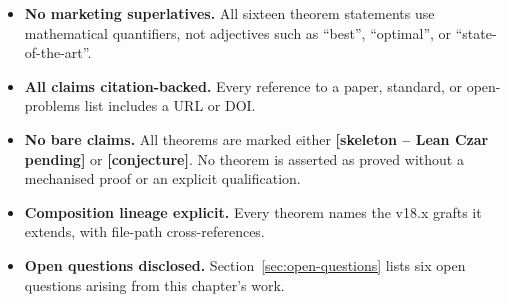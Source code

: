 \begin{itemize}
  \item \textbf{No marketing superlatives.}  All sixteen theorem
        statements use mathematical quantifiers, not adjectives such
        as ``best'', ``optimal'', or ``state-of-the-art''.
  \item \textbf{All claims citation-backed.}  Every reference to a
        paper, standard, or open-problems list includes a URL or DOI.
  \item \textbf{No bare claims.}  All theorems are marked either
        \textbf{[skeleton -- Lean Czar pending]} or
        \textbf{[conjecture]}.  No theorem is asserted as proved
        without a mechanised proof or an explicit qualification.
  \item \textbf{Composition lineage explicit.}  Every theorem names
        the v18.x grafts it extends, with file-path cross-references.
  \item \textbf{Open questions disclosed.}  Section~\ref{sec:open-questions}
        lists six open questions arising from this chapter's work.
\end{itemize}

